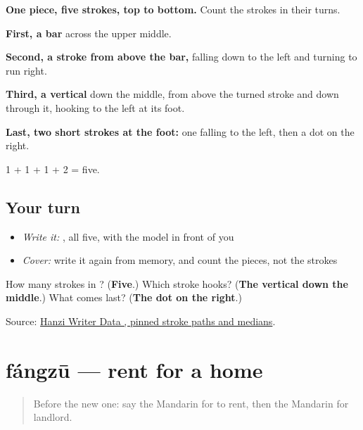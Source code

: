 \begin{quote}
\end{quote}

\textbf{One piece, five strokes, top to bottom.} Count the strokes in their turns.

\textbf{First, a bar} across the upper middle.

\textbf{Second, a stroke from above the bar,} falling down to the left and turning to run right.

\textbf{Third, a vertical} down the middle, from above the turned stroke and down through it, hooking to the left at its foot.

\textbf{Last, two short strokes at the foot:} one falling to the left, then a dot on the right.

1 + 1 + 1 + 2 = five.

\subsection*{Your turn}
\begin{itemize}
\raggedright
  \item \emph{Write it:} , all five, with the model in front of you
  \item \emph{Cover:} write it again from memory, and count the pieces, not the strokes
\end{itemize}

\begin{tcolorbox}[breakable,colback=teal!4,colframe=teal!35!black,title={Before you move on}]
How many strokes in ? (\textbf{Five}.) Which stroke hooks? (\textbf{The vertical down the middle}.) What comes last? (\textbf{The dot on the right}.)

Source: \href{https://raw.githubusercontent.com/chanind/hanzi-writer-data/68d10a4b21150cae5e1ebbd223eed289cf32d90c/data/\%E4\%B8\%9C.json}{Hanzi Writer Data , pinned stroke paths and medians}.
\end{tcolorbox}
\section[fángzū]{fángzū — rent for a home}

\label{lesson:ZH-C203-fangzu}



\begin{quote}
Before the new one: say the Mandarin for to rent, then the Mandarin for landlord.
\end{quote}

